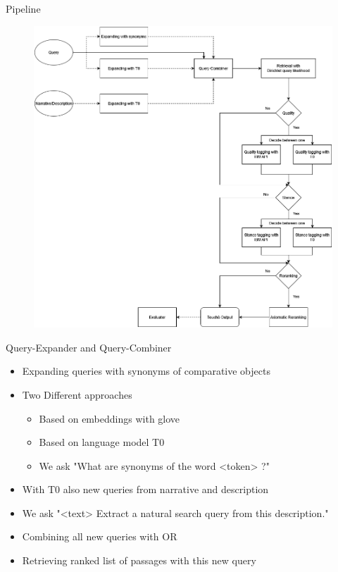 \documentclass[english]{mlutalk}
\begin{document}
\begin{frame}{Pipeline}
    \begin{figure}
        \centering
        \includegraphics[scale=0.25]{figures/pipeline}
    \end{figure}
\end{frame}

\begin{frame}{Query-Expander and Query-Combiner}
    \begin{itemize}
        \item Expanding queries with synonyms of comparative objects
        \item Two Different approaches
        \begin{itemize}
            \item Based on embeddings with glove
            \item Based on language model T0~\cite{SanhWRBSACSLRDBXTSSKCNDCJWMSYPBWNRSSFFTBGBWR2021}
            \item We ask "What are synonyms of the word <token> ?" 
        \end{itemize}
        \item With T0 also new queries from narrative and description
        \item We ask "<text> Extract a natural search query from this description."
        \item Combining all new queries with OR
        \item Retrieving ranked list of passages with this new query 
    \end{itemize}
\end{frame}
\end{document}
